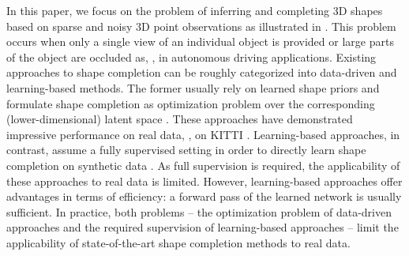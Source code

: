 In this paper, we focus on the problem of inferring and completing 3D shapes based on sparse and noisy 3D point observations as illustrated in .
This problem occurs when only a single view of an individual object is provided or large parts of the object are occluded as, \eg, in autonomous driving applications.
Existing approaches to shape completion can be roughly categorized into data-driven and learning-based methods. The former usually rely on learned shape priors and formulate shape completion as optimization problem over the corresponding (lower-dimensional) latent space \cite{Engelmann2016GCPR,Bao2013CVPR,Dame2013CVPR,Guney2015CVPR}. These approaches have demonstrated impressive performance on real data, \eg, on KITTI \cite{Geiger2012CVPR}.
Learning-based approaches, in contrast, assume a fully supervised setting in order to directly learn shape completion on synthetic data \cite{Riegler2017THREEDV,SmithARXIV2017,Dai2017CVPRa,Sharma2016ARXIV,Fan2016ARXIV,Rezende2016ARXIV}. As full supervision is required, the applicability of these approaches to real data is limited.
However, learning-based approaches offer advantages in terms of efficiency: a forward pass of the learned network is usually sufficient. In practice, both problems -- the optimization problem of data-driven approaches and the required supervision of learning-based approaches -- limit the applicability of state-of-the-art shape completion methods to real data.


